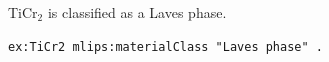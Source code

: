 TiCr$_2$ is classified as a Laves phase.
\begin{lstlisting}[language=turtle]
ex:TiCr2 mlips:materialClass "Laves phase" .
\end{lstlisting}
